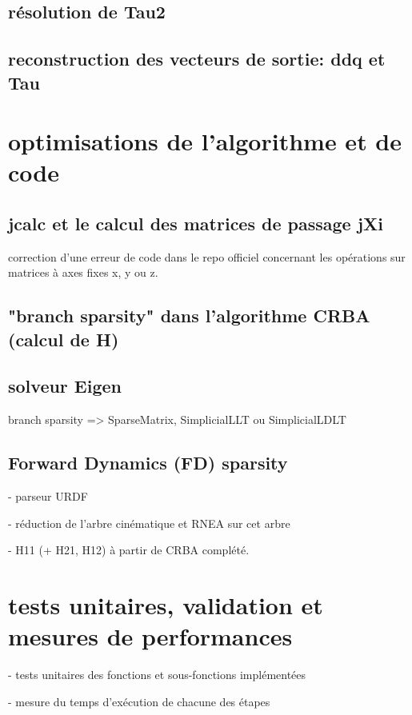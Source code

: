 \documentclass{report}
\begin{document}
\subsection{résolution de Tau2}

\subsection{reconstruction des vecteurs de sortie: ddq et Tau}


\section{optimisations de l'algorithme et de code}

\subsection{jcalc et le calcul des matrices de passage jXi}
correction d'une erreur de code dans le repo officiel concernant les opérations sur matrices à axes fixes x, y ou z.

\subsection{"branch sparsity" dans l'algorithme CRBA (calcul de H)}

\subsection{solveur Eigen}
branch sparsity => SparseMatrix, SimplicialLLT ou SimplicialLDLT

\subsection{Forward Dynamics (FD) sparsity}
- parseur URDF

- réduction de l'arbre cinématique et RNEA sur cet arbre

- H11 (+ H21, H12) à partir de CRBA complété.



\section{tests unitaires, validation et mesures de performances}

- tests unitaires des fonctions et sous-fonctions implémentées

- mesure du temps d'exécution de chacune des étapes
\end{document}
